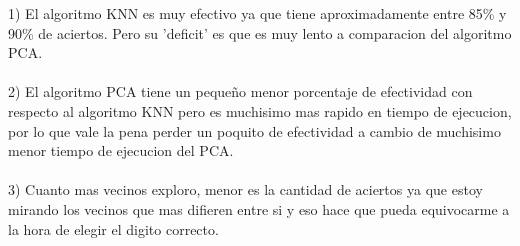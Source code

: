 
1) El algoritmo KNN es muy efectivo ya que tiene aproximadamente entre 85\% y 90\% de aciertos. Pero su 'deficit' es que es muy lento a comparacion del algoritmo PCA.\\ \\
2) El algoritmo PCA tiene un pequeño menor porcentaje de efectividad con respecto al algoritmo KNN pero es muchisimo mas rapido en tiempo de ejecucion, por lo que vale la pena perder un poquito de efectividad a cambio de muchisimo menor tiempo de ejecucion del PCA.\\ \\
3) Cuanto mas vecinos exploro, menor es la cantidad de aciertos ya que estoy mirando los vecinos que mas difieren entre si y eso hace que pueda equivocarme a la hora de elegir el digito correcto. 
\\ \\